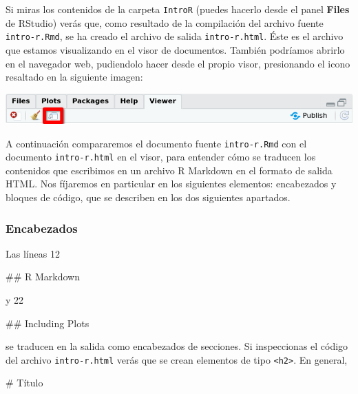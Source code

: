 \documentclass[
  title=normal,
  notoc,
  bib=normal]{mnye}
\newenvironment{Shaded}{\begin{snugshade}}{\end{snugshade}}
\newcommand{\FunctionTok}[1]{\textcolor[rgb]{0.00,0.00,0.00}{#1}}
\begin{document}
Si miras los contenidos de la carpeta \texttt{IntroR} (puedes hacerlo desde el panel \textbf{Files} de \textsf{RStudio}) verás que, como resultado de la compilación del archivo fuente \texttt{intro-r.Rmd}, se ha creado el archivo de salida \texttt{intro-r.html}. Éste es el archivo que estamos visualizando en el visor de documentos. También podríamos abrirlo en el navegador web, pudiendolo hacer desde el propio visor, presionando el icono resaltado en la siguiente imagen:

\begin{center}\includegraphics[width=1\linewidth]{images/open-in-new-window} \end{center}

A continuación compararemos el documento fuente \texttt{intro-r.Rmd} con el documento \texttt{intro-r.html} en el visor, para entender cómo se traducen los contenidos que escribimos en un archivo R Markdown en el formato de salida HTML. Nos fíjaremos en particular en los siguientes elementos: encabezados y bloques de código, que se describen en los dos siguientes apartados.

\hypertarget{encabezados}{%
\subsubsection{Encabezados}\label{encabezados}}

Las líneas 12

\begin{Shaded}
\begin{Highlighting}[]
\FunctionTok{\#\# R Markdown }
\end{Highlighting}
\end{Shaded}

y 22

\begin{Shaded}
\begin{Highlighting}[]
\FunctionTok{\#\# Including Plots}
\end{Highlighting}
\end{Shaded}

se traducen en la salida como encabezados de secciones. Si inspeccionas el código del archivo \texttt{intro-r.html} verás que se crean elementos de tipo \texttt{\textless{}h2\textgreater{}}. En general,

\begin{Shaded}
\begin{Highlighting}[]
\FunctionTok{\# Título}
\end{Highlighting}
\end{Shaded}
\end{document}
